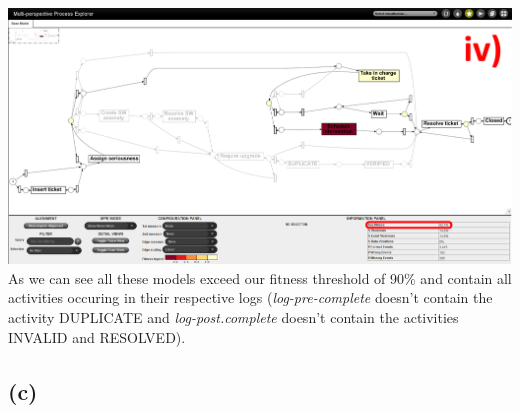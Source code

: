 \documentclass[../../main.tex]{subfiles}
\begin{document}
\includegraphics[width=0.5\columnwidth]{img/ProM_b_1iv.png}
As we can see all these models exceed our fitness threshold of 90\% and contain all activities occuring in their respective logs (\textit{log-pre-complete} doesn't contain the activity DUPLICATE and \textit{log-post.complete} doesn't contain the activities INVALID and RESOLVED).

\subsection*{(c)}
\end{document}
